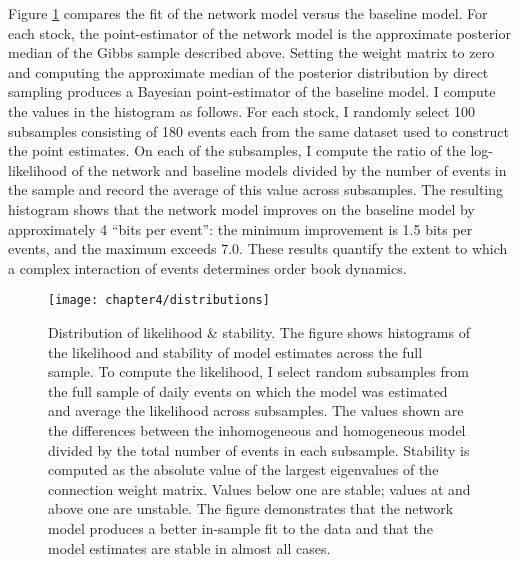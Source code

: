 		Figure \ref{fig:distributions} compares the fit of the network model versus the baseline model. For each stock, the point-estimator of the network model is the approximate posterior median of the Gibbs sample described above. Setting the weight matrix to zero and computing the approximate median of the posterior distribution by direct sampling produces a Bayesian point-estimator of the baseline model. I compute the values in the histogram as follows. For each stock, I randomly select 100 subsamples consisting of 180 events each from the same dataset used to construct the point estimates. On each of the subsamples, I compute the ratio of the log-likelihood of the network and baseline models divided by the number of events in the sample and record the average of this value across subsamples. The resulting histogram shows that the network model improves on the baseline model by approximately 4 ``bits per event'': the minimum improvement is 1.5 bits per events, and the maximum exceeds 7.0. These results quantify the extent to which a complex interaction of events determines order book dynamics.

		\begin{figure}[p]
			\small
			\linespread{1}
			\centering
			\texttt{[image: chapter4/distributions]}
			\captionsetup{skip=-20pt, position=below, font=footnotesize, justification=justified, width=\linewidth}
			\caption[Distribution of likelihood \& stability]{Distribution of likelihood \& stability. The figure shows histograms of the likelihood and stability of model estimates across the full sample. To compute the likelihood, I select random subsamples from the full sample of daily events on which the model was estimated and average the likelihood across subsamples. The values shown are the differences between the inhomogeneous and homogeneous model divided by the total number of events in each subsample. Stability is computed as the absolute value of the largest eigenvalues of the connection weight matrix. Values below one are stable; values at and above one are unstable.  The figure demonstrates that the network model produces a better in-sample fit to the data and that the model estimates are stable in almost all cases.}
			\label{fig:distributions}
		\end{figure}

